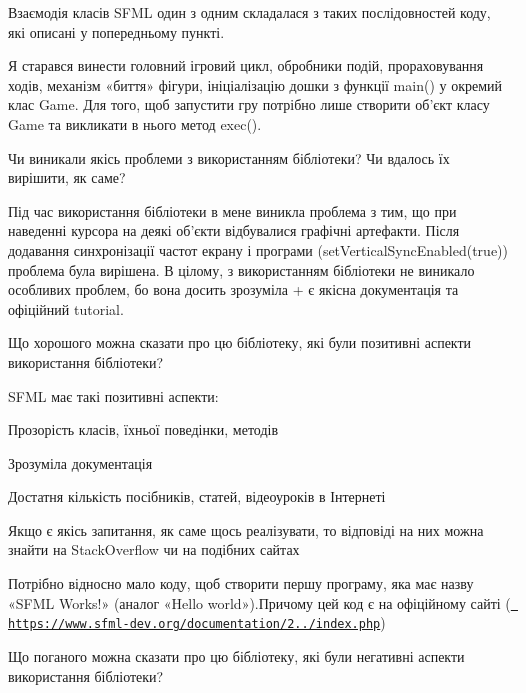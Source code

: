 Взаємодія класів SFML один з одним складалася з таких послідовностей коду, які описані у попередньому пункті.

Я старався винести головний ігровий цикл, обробники подій, прораховування ходів, механізм «биття» фігури, ініціалізацію дошки з функції main() у окремий клас Game. Для того, щоб запустити гру потрібно лише створити об’єкт класу Game та викликати в нього метод exec().


\begin{DoxyEnumerate}
\item Чи виникали якісь проблеми з використанням бібліотеки? Чи вдалось їх вирішити, як саме?
\end{DoxyEnumerate}

Під час використання бібліотеки в мене виникла проблема з тим, що при наведенні курсора на деякі об’єкти відбувалися графічні артефакти. Після додавання синхронізації частот екрану і програми (set\+Vertical\+Sync\+Enabled(true)) проблема була вирішена. В цілому, з використанням бібліотеки не виникало особливих проблем, бо вона досить зрозуміла + є якісна документація та офіційний tutorial.


\begin{DoxyEnumerate}
\item Що хорошого можна сказати про цю бібліотеку, які були позитивні аспекти використання бібліотеки?
\end{DoxyEnumerate}

SFML має такі позитивні аспекти\+:
\begin{DoxyItemize}
\item Прозорість класів, їхньої поведінки, методів
\item Зрозуміла документація
\item Достатня кількість посібників, статей, відеоуроків в Інтернеті
\item Якщо є якісь запитання, як саме щось реалізувати, то відповіді на них можна знайти на Stack\+Overflow чи на подібних сайтах
\item Потрібно відносно мало коду, щоб створити першу програму, яка має назву «\+SFML Works!» (аналог «\+Hello world»).Причому цей код є на офіційному сайті (\href{https://www.sfml-dev.org/documentation/2.5.1/index.php}{\texttt{ https\+://www.\+sfml-\/dev.\+org/documentation/2../index.\+php}})
\end{DoxyItemize}
\begin{DoxyEnumerate}
\item Що поганого можна сказати про цю бібліотеку, які були негативні аспекти використання бібліотеки?
\end{DoxyEnumerate}

